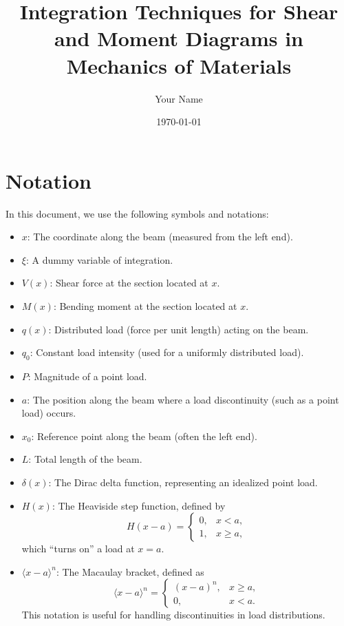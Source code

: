 \documentclass[12pt]{article}
\title{Integration Techniques for Shear and Moment Diagrams in Mechanics of Materials}
\author{Your Name}
\date{\today}
\begin{document}
\maketitle
\tableofcontents
\newpage

\section*{Notation}
In this document, we use the following symbols and notations:
\begin{itemize}[leftmargin=*]
  \item \textbf{$x$}: The coordinate along the beam (measured from the left end).
  \item \textbf{$\xi$}: A dummy variable of integration.
  \item \textbf{$V(x)$}: Shear force at the section located at $x$.
  \item \textbf{$M(x)$}: Bending moment at the section located at $x$.
  \item \textbf{$q(x)$}: Distributed load (force per unit length) acting on the beam.
  \item \textbf{$q_0$}: Constant load intensity (used for a uniformly distributed load).
  \item \textbf{$P$}: Magnitude of a point load.
  \item \textbf{$a$}: The position along the beam where a load discontinuity (such as a point load) occurs.
  \item \textbf{$x_0$}: Reference point along the beam (often the left end).
  \item \textbf{$L$}: Total length of the beam.
  \item \textbf{$\delta(x)$}: The Dirac delta function, representing an idealized point load.
  \item \textbf{$H(x)$}: The Heaviside step function, defined by
    \[
    H(x-a) = \begin{cases}
    0, & x < a, \\
    1, & x \ge a,
    \end{cases}
    \]
    which “turns on” a load at $x=a$.
  \item \textbf{$\langle x-a \rangle^n$}: The Macaulay bracket, defined as
    \[
    \langle x - a \rangle^n =
    \begin{cases}
      (x-a)^n, & x \ge a, \\
      0,       & x < a.
    \end{cases}
    \]
    This notation is useful for handling discontinuities in load distributions.
\end{itemize}
\end{document}

